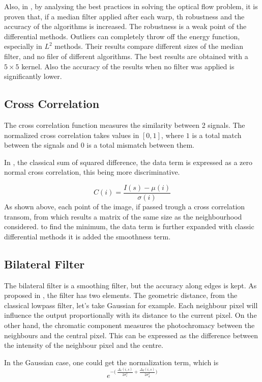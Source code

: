 \documentclass[12pt,a4paper,twoside]{report}
\begin{document}
Also, in \cite{sun2010}, by analysing the best practices in solving the optical flow problem, it is proven that, if a median filter applied after each warp, th robustness and the accuracy of the algorithms is increased.
The robustness is a weak point of the differential methods. Outliers can completely throw off the energy function, especially in $L^2$ methods.
Their results compare different sizes of the median filter, and no filer of different algorithms. The best results are obtained with a $5 \times 5$ kernel. Also the accuracy of the results when no filter was applied is significantly lower.  


\subsection{Cross Correlation}
The cross correlation function measures the similarity between 2 signals.
The normalized cross correlation takes values in $[0,1]$, where $1$ is a total match between the signals and $0$ is a total mismatch between them.

In \cite{drulea2013}, the classical sum of squared difference, the data term is expressed as a zero normal cross correlation, this being more discriminative. 
 
 \begin{equation}
 C(i) = \frac{I(s)- \mu(i)}{\sigma(i)}
 \end{equation}
As shown above, each point of the image, if passed trough a cross correlation transom, from which results a matrix of the same size as the neighbourhood considered. to find the minimum, the data term is further expanded with classic differential methods it is added the smoothness term.

\subsection{Bilateral Filter} \label{bf}
The bilateral filter is a smoothing filter, but the accuracy along edges is kept. 
As proposed in \cite{tomasi1998bilateral}, the filter has two elements. The geometric distance, from the classical lowpass filter, let's take Gaussian for example. Each neighbour pixel will influence the output proportionally with its distance to the current pixel. On the other hand, the chromatic component measures the photochromacy between the neighbours and the central pixel. This can be expressed as the difference between the intensity of the neighbour pixel and the centre. 

In the Gaussian case, one could get the normalization term, which is
\begin{equation} \label{bilateralFilterTerm}
	e^{-\big(\ \frac{\Delta_c(i,s)}{2\sigma_c^2}+ \frac{\Delta_d(i,s)}{2\sigma_d^2}\big)}
\end{equation}
\end{document}
